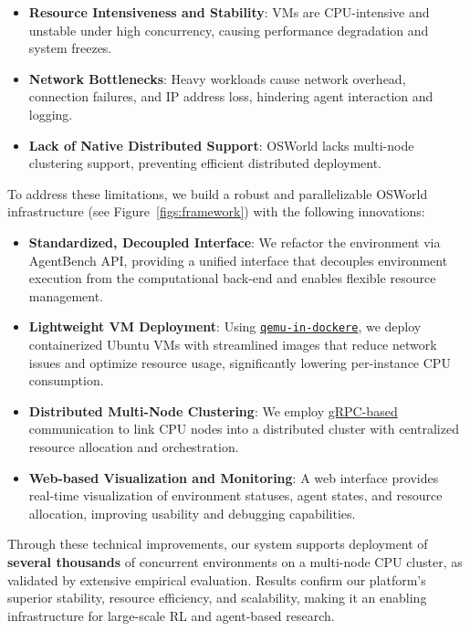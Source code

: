 \begin{itemize}[leftmargin=1.5em,itemsep=0pt,parsep=0.2em,topsep=0.0em,partopsep=0.0em]
    \item \textbf{Resource Intensiveness and Stability}: VMs are CPU-intensive and unstable under high concurrency, causing performance degradation and system freezes.
    \item \textbf{Network Bottlenecks}: Heavy workloads cause network overhead, connection failures, and IP address loss, hindering agent interaction and logging.
    \item \textbf{Lack of Native Distributed Support}: OSWorld lacks multi-node clustering support, preventing efficient distributed deployment.
\end{itemize}

To address these limitations, we build a robust and parallelizable OSWorld infrastructure (see Figure~\ref{figs:framework}) with the following innovations:
\begin{itemize}[leftmargin=1.5em,itemsep=0pt,parsep=0.2em,topsep=0.0em,partopsep=0.0em]
    \item \textbf{Standardized, Decoupled Interface}: We refactor the environment via AgentBench API, providing a unified interface that decouples environment execution from the computational back-end and enables flexible resource management.
    \item \textbf{Lightweight VM Deployment}: Using \href{https://github.com/qemus/qemu}{\texttt{qemu-in-dockere}}, we deploy containerized Ubuntu VMs with streamlined images that reduce network issues and optimize resource usage, significantly lowering per-instance CPU consumption.
    \item \textbf{Distributed Multi-Node Clustering}: We employ \href{https://github.com/grpc}{gRPC-based} communication to link CPU nodes into a distributed cluster with centralized resource allocation and orchestration.
    \item \textbf{Web-based Visualization and Monitoring}: A web interface provides real-time visualization of environment statuses, agent states, and resource allocation, improving usability and debugging capabilities.
\end{itemize}

Through these technical improvements, our system supports deployment of \textbf{several thousands} of concurrent environments on a multi-node CPU cluster, as validated by extensive empirical evaluation. Results confirm our platform’s superior stability, resource efficiency, and scalability, making it an enabling infrastructure for large-scale RL and agent-based research.

